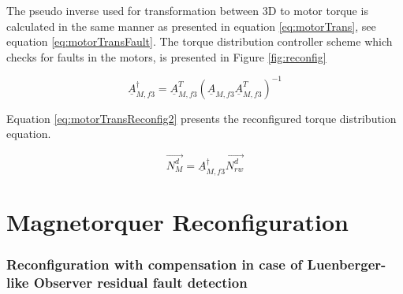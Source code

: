 The pseudo inverse used for transformation between 3D to motor torque is calculated in the same manner as presented in equation \ref{eq:motorTrans}, see equation \ref{eq:motorTransFault}. The torque distribution controller scheme which checks for faults in the motors, is presented in Figure \ref{fig:reconfig}

\begin{equation}
	\label{eq:motorTransFault}
	\underline{A}_{M,f3}^\dagger   = \underline{A}_{M,f3}^T  (\underline{A}_{M,f3} \underline{A}_{M,f3}^T)^{-1}
\end{equation}
%

Equation \ref{eq:motorTransReconfig2} presents the reconfigured torque distribution equation.

\begin{equation}
\label{eq:motorTransReconfig2}
\vec{N_{M}^d} = \underline{A}_{M,f3}^\dagger \vec{N_{rw}^d}  
\end{equation}






\section{Magnetorquer Reconfiguration}
\label{sec:MTReconfig}

\subsubsection{Reconfiguration with compensation in case of Luenberger-like Observer residual fault detection}

